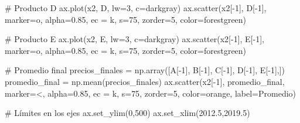 \documentclass[
  letterpaper,
  DIV=11,
  numbers=noendperiod]{scrreprt}
\newenvironment{Shaded}{\begin{snugshade}}{\end{snugshade}}
\newcommand{\CommentTok}[1]{\textcolor[rgb]{0.37,0.37,0.37}{#1}}
\newcommand{\DecValTok}[1]{\textcolor[rgb]{0.68,0.00,0.00}{#1}}
\newcommand{\FloatTok}[1]{\textcolor[rgb]{0.68,0.00,0.00}{#1}}
\newcommand{\NormalTok}[1]{\textcolor[rgb]{0.00,0.23,0.31}{#1}}
\newcommand{\OperatorTok}[1]{\textcolor[rgb]{0.37,0.37,0.37}{#1}}
\newcommand{\StringTok}[1]{\textcolor[rgb]{0.13,0.47,0.30}{#1}}
\begin{document}
\begin{Shaded}
\begin{Highlighting}[]
\CommentTok{\# Producto D}
\NormalTok{ax.plot(x2, D, lw}\OperatorTok{=}\DecValTok{3}\NormalTok{, c}\OperatorTok{=}\StringTok{\textquotesingle{}darkgray\textquotesingle{}}\NormalTok{)}
\NormalTok{ax.scatter(x2[}\OperatorTok{{-}}\DecValTok{1}\NormalTok{], D[}\OperatorTok{{-}}\DecValTok{1}\NormalTok{], marker}\OperatorTok{=}\StringTok{\textquotesingle{}o\textquotesingle{}}\NormalTok{, alpha}\OperatorTok{=}\FloatTok{0.85}\NormalTok{, ec }\OperatorTok{=} \StringTok{\textquotesingle{}k\textquotesingle{}}\NormalTok{, s}\OperatorTok{=}\DecValTok{75}\NormalTok{, zorder}\OperatorTok{=}\DecValTok{5}\NormalTok{, color}\OperatorTok{=}\StringTok{\textquotesingle{}forestgreen\textquotesingle{}}\NormalTok{)}

\CommentTok{\# Producto E}
\NormalTok{ax.plot(x2, E, lw}\OperatorTok{=}\DecValTok{3}\NormalTok{, c}\OperatorTok{=}\StringTok{\textquotesingle{}darkgray\textquotesingle{}}\NormalTok{)}
\NormalTok{ax.scatter(x2[}\OperatorTok{{-}}\DecValTok{1}\NormalTok{], E[}\OperatorTok{{-}}\DecValTok{1}\NormalTok{], marker}\OperatorTok{=}\StringTok{\textquotesingle{}o\textquotesingle{}}\NormalTok{, alpha}\OperatorTok{=}\FloatTok{0.85}\NormalTok{, ec }\OperatorTok{=} \StringTok{\textquotesingle{}k\textquotesingle{}}\NormalTok{, s}\OperatorTok{=}\DecValTok{75}\NormalTok{, zorder}\OperatorTok{=}\DecValTok{5}\NormalTok{, color}\OperatorTok{=}\StringTok{\textquotesingle{}forestgreen\textquotesingle{}}\NormalTok{)}

\CommentTok{\# Promedio final}
\NormalTok{precios\_finales }\OperatorTok{=}\NormalTok{ np.array([A[}\OperatorTok{{-}}\DecValTok{1}\NormalTok{], B[}\OperatorTok{{-}}\DecValTok{1}\NormalTok{], C[}\OperatorTok{{-}}\DecValTok{1}\NormalTok{], D[}\OperatorTok{{-}}\DecValTok{1}\NormalTok{], E[}\OperatorTok{{-}}\DecValTok{1}\NormalTok{],])}
\NormalTok{promedio\_final }\OperatorTok{=}\NormalTok{ np.mean(precios\_finales)}
\NormalTok{ax.scatter(x2[}\OperatorTok{{-}}\DecValTok{1}\NormalTok{], promedio\_final, marker}\OperatorTok{=}\StringTok{\textquotesingle{}\textless{}\textquotesingle{}}\NormalTok{, alpha}\OperatorTok{=}\FloatTok{0.85}\NormalTok{, ec }\OperatorTok{=} \StringTok{\textquotesingle{}k\textquotesingle{}}\NormalTok{, s}\OperatorTok{=}\DecValTok{75}\NormalTok{, }
\NormalTok{           zorder}\OperatorTok{=}\DecValTok{5}\NormalTok{, color}\OperatorTok{=}\StringTok{\textquotesingle{}orange\textquotesingle{}}\NormalTok{, label}\OperatorTok{=}\StringTok{\textquotesingle{}Promedio\textquotesingle{}}\NormalTok{)}

\CommentTok{\# Límites en los ejes}
\NormalTok{ax.set\_ylim(}\DecValTok{0}\NormalTok{,}\DecValTok{500}\NormalTok{)}
\NormalTok{ax.set\_xlim(}\FloatTok{2012.5}\NormalTok{,}\FloatTok{2019.5}\NormalTok{)}


\end{Highlighting}
\end{Shaded}
\end{document}
